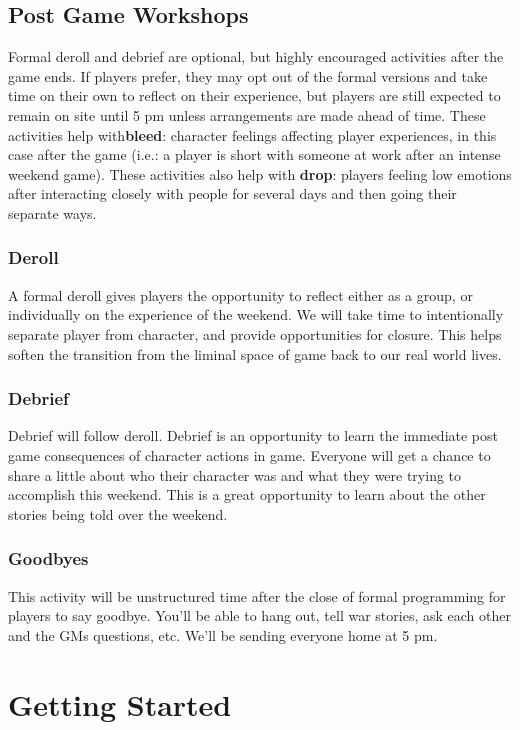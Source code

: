 \documentclass[sheet]{GL2020}
\begin{document}
\subsection{Post Game Workshops}
Formal deroll and debrief are optional, but highly encouraged activities after the game ends. If players prefer, they may opt out of the formal versions and take time on their own to reflect on their experience, but players are still expected to remain on site until 5 pm unless arrangements are made ahead of time. These activities help with\textbf{bleed}: character feelings affecting player experiences, in this case after the game (i.e.: a player is short with someone at work after an intense weekend game). These activities also help with \textbf{drop}: players feeling low emotions after interacting closely with people for several days and then going their separate ways.

\subsubsection{Deroll}
A formal deroll gives players the opportunity to reflect either as a group, or individually on the experience of the weekend. We will take time to intentionally separate player from character, and provide opportunities for closure. This helps soften the transition from the liminal space of game back to our real world lives.

\subsubsection{Debrief} 
Debrief will follow deroll. Debrief is an opportunity to learn the immediate post game consequences of character actions in game. Everyone will get a chance to share a little about who their character was and what they were trying to accomplish this weekend. This is a great opportunity to learn about the other stories being told over the weekend.

\subsubsection{Goodbyes}
This activity will be unstructured time after the close of formal programming for players to say goodbye. You’ll be able to hang out, tell war stories, ask each other and the GMs questions, etc. We’ll be sending everyone home at 5 pm.

\vfill

\clearpage
\section{Getting Started}
\end{document}
